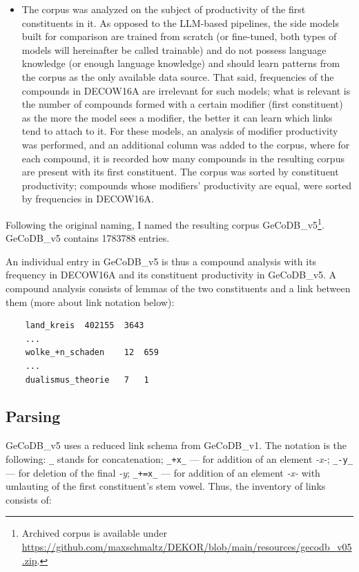 \documentclass[11pt]{article}
\begin{document}
\begin{itemize}
    \item The corpus was analyzed on the subject of productivity of the first constituents in it. As opposed to the LLM-based pipelines, the side models built for comparison are trained from scratch (or fine-tuned, both types of models will hereinafter be called trainable) and do not possess language knowledge (or enough language knowledge) and should learn patterns from the corpus as the only available data source. That said, frequencies of the compounds in DECOW16A are irrelevant for such models; what is relevant is the number of compounds formed with a certain modifier (first constituent) as the more the model sees a modifier, the better it can learn which links tend to attach to it. For these models, an analysis of modifier productivity was performed, and an additional column was added to the corpus, where for each compound, it is recorded how many compounds in the resulting corpus are present with its first constituent. The corpus was sorted by constituent productivity; compounds whose modifiers' productivity are equal, were sorted by frequencies in DECOW16A.
    
\end{itemize}

Following the original naming, I named the resulting corpus GeCoDB\_v5\footnote{Archived corpus is available under \url{https://github.com/maxschmaltz/DEKOR/blob/main/resources/gecodb_v05.zip}.}. GeCoDB\_v5 contains 1783788 entries.

An individual entry in GeCoDB\_v5 is thus a compound analysis with its frequency in DECOW16A and its constituent productivity in GeCoDB\_v5. A compound analysis consists of lemmas of the two constituents and a link between them (more about link notation below):

\begin{verbatim}
    land_kreis	402155	3643
    ...
    wolke_+n_schaden	12	659
    ...
    dualismus_theorie	7	1
\end{verbatim}


\subsection{Parsing}

GeCoDB\_v5 uses a reduced link schema from GeCoDB\_v1. The notation is the following: \texttt{\_} stands for concatenation; \texttt{\_+x\_} --- for addition of an element \textit{-x-}; \texttt{\_-y\_} --- for deletion of the final \textit{-y}; \texttt{\_+=x\_} --- for addition of an element \textit{-x-} with umlauting of the first constituent's stem vowel. Thus, the inventory of links consists of:
\end{document}
